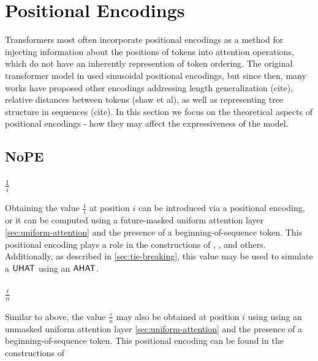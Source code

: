 %
\chapter{Positional Encodings}
%

Transformers most often incorporate positional encodings as a method for injecting information about the positions of tokens into attention operations, which do not have an inherently represention of token ordering. The original transformer model in \citet{vaswani-etal-2017-attention} used sinusoidal positional encodings, but since then, many works have proposed other encodings addressing length generalization (cite), relative distances between tokens (shaw et al), as well as representing tree structure in sequences (cite). In this section we focus on the theoretical aspects of positional encodings - how they may affect the expressiveness of the model.


\section{NoPE}

\subsection{$\frac{1}{i}$}

Obtaining the value $\frac{1}{i}$ at position $i$ can be introduced via a positional encoding, or it can be computed using a future-masked uniform attention layer \cref{sec:uniform-attention} and the presence of a beginning-of-sequence token. This positional encoding plays a role in the constructions of \citet{barcelo-etal-2024-logical}, \citet{merrill-sabharwal-2024-cot}, and others. Additionally, as described in \cref{sec:tie-breaking}, this value may be used to simulate a $\textsf{UHAT}$ using an $\textsf{AHAT}$.



\subsection{$\frac{i}{n}$}

Similar to above, the value $\frac{i}{n}$ may also be obtained at position $i$ using using an unmasked uniform attention layer \cref{sec:uniform-attention} and the presence of a beginning-of-sequence token. This positional encoding can be found in the constructions of 

